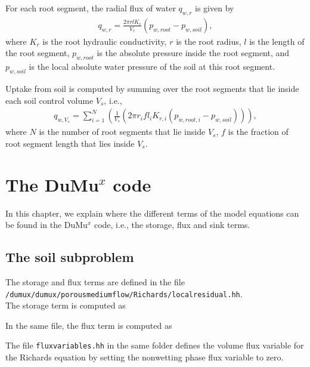 For each root segment, the radial flux of water $q_{w,r}$ is given by 
\begin{eqnarray}
q_{w,r} = \frac{2 \pi r l K_r}{V_r} (p_{w,root}-p_{w,soil}),
\end{eqnarray}
where $K_r$ is the root hydraulic conductivity, $r$ is the root radius, $l$ is the length of the root segment, $p_{w,root}$ is the absolute pressure inside the root segment, and $p_{w,soil}$ is the local absolute water pressure of the soil at this root segment. 

Uptake from soil is computed by summing over the root segments that lie inside each soil control volume $V_s$, i.e.,
\begin{eqnarray}
q_{w,V_s} = \sum_{i=1}^{N}\left(\frac{1}{V_s}(2 \pi r_i f l_i K_{r,i} (p_{w,root,i}-p_{w,soil})) \right),
\end{eqnarray}
where $N$ is the number of root segments that lie inside $V_s$, $f$ is the fraction of root segment length that lies inside $V_s$. 

\section*{The DuMu$^x$ code}
In this chapter, we explain where the different terms of the model equations can be found in the DuMu$^x$ code, i.e., the storage, flux and sink terms. 

\subsection*{The soil subproblem}
The storage and flux terms are defined in the file \\
\verb+/dumux/dumux/porousmediumflow/Richards/localresidual.hh+.\\
The storage term is computed as
		

In the same file, the flux term is computed as 	
												

The file \verb+fluxvariables.hh+ in the same folder defines the volume flux variable for the Richards equation by setting the nonwetting phase flux variable to zero. 
	

